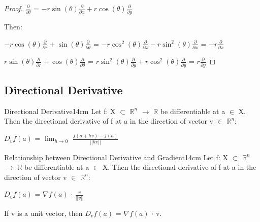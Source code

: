 \begin{proof}
        \hspace{0.5cm}
        $\frac{\partial}{\partial \theta}$
        = $-r \sin(\theta) \frac{\partial}{\partial x}
            + r \cos(\theta) \frac{\partial}{\partial y}$

        Then:

        \hspace{0.5cm}
        $-r \cos(\theta) \frac{\partial }{\partial r}
            + \sin(\theta) \frac{\partial}{\partial \theta}$
        = $-r\cos^2(\theta)\frac{\partial }{\partial x}
            -r\sin^2(\theta)\frac{\partial }{\partial x}$
        = $-r \frac{\partial }{\partial x}$

        \hspace{0.5cm}
        $r \sin(\theta) \frac{\partial }{\partial r}
            + \cos(\theta) \frac{\partial}{\partial \theta}$
        = $r\sin^2(\theta)\frac{\partial }{\partial y}
            + r\cos^2(\theta)\frac{\partial }{\partial y}$
        = $r \frac{\partial }{\partial y}$
    \end{proof}

    \newpage





\subsection{ Directional Derivative }

    \begin{definition}{Directional Derivative}{14cm}
        Let f: X $\subset$ $\mathbb{R}^n$ $\rightarrow$ $\mathbb{R}$
        be differentiable at a $\in$ X.
        Then the {\color{lblue} directional derivative} of f at a
        in the direction of vector v $\in$ $\mathbb{R}^n$:

        \hspace{0.5cm}
        $D_vf(a)$ = $\lim_{h \rightarrow 0}$ $\frac{f(a+hv) - f(a)}{||hv||}$
    \end{definition}

    \vspace{0.5cm}



    \begin{wtheorem}{Relationship between Directional Derivative and Gradient}{14cm}
        Let f: X $\subset$ $\mathbb{R}^n$ $\rightarrow$ $\mathbb{R}$
        be differentiable at a $\in$ X.
        Then the directional derivative of f at a
        in the direction of vector v $\in$ $\mathbb{R}^n$:

        \hspace{0.5cm}
        $D_vf(a)$ = $\nabla f(a)$ $\cdot$ $\frac{v}{||v||}$

        If v is a unit vector, then $D_vf(a)$ = $\nabla f(a)$ $\cdot$ v.
    \end{wtheorem}

